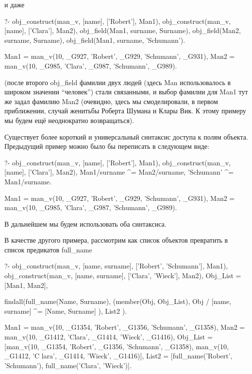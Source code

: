 \documentclass[a4paper]{book}
\begin{document}
и даже

\begin{example}{}{}
?- obj_construct(man_v, [name], ['Robert'], Man1), 
   obj_construct(man_v, [name], ['Clara'], Man2), 
   obj_field(Man1, surname, Surname), 
   obj_field(Man2, surname, Surname), 
   obj_field(Man1, surname, 'Schumann').

Man1 = man_v(10, _G927, 'Robert', _G929, 'Schumann', _G931),
Man2 = man_v(10, _G985, 'Clara', _G987, 'Schumann', _G989).
\end{example}

(после второго obj_field фамилии двух людей (здесь Man
использовалось в широком значении ``человек'') стали связанными,
и выбор фамилии для Man1 тут же задал фамилию Man2 (очевидно,
здесь мы смоделировали, в первом приближении, случай женитьбы
Роберта Шумана и Клары Вик. К этому примеру мы будем ещё
неоднократно возвращаться).

Существует более короткий и универсальный синтаксис доступа к полям
объекта. Предыдущий пример можно было бы переписать в следующем виде:

\begin{example}{}{}
?- obj_construct(man_v, [name], ['Robert'], Man1), 
   obj_construct(man_v, [name], ['Clara'], Man2), 
   Man1/surname ^= Man2/surname,
   'Schumann' ^= Man1/surname.

Man1 = man_v(10, _G927, 'Robert', _G929, 'Schumann', _G931),
Man2 = man_v(10, _G985, 'Clara', _G987, 'Schumann', _G989).
\end{example}

В дальнейшем мы будем использовать оба синтаксиса.

В качестве другого примера, рассмотрим как список объектов превратить в список
предикатов full_name

\begin{bigexample}{}{}
?- obj_construct(man_v, [name, surname], ['Robert', 'Schumann'],
                 Man1), 
   obj_construct(man_v, [name, surname], ['Clara', 'Wieck'],
                 Man2),
   Obj_List = [Man1, Man2], 

   findall(full_name(Name, Surname), 
           (member(Obj, Obj_List), 
            Obj / [name, surname] ^= [Name, Surname]
            ), 
           List2
           ).

Man1 = man_v(10, _G1354, 'Robert', _G1356, 'Schumann', _G1358),
Man2 = man_v(10, _G1412, 'Clara', _G1414, 'Wieck', _G1416),
Obj_List = [man_v(10, _G1354, 'Robert', _G1356, 'Schumann', _G1358), man_v(10, _G1412, 'C
lara', _G1414, 'Wieck', _G1416)],                                                       
List2 = [full_name('Robert', 'Schumann'), full_name('Clara', 'Wieck')].
\end{bigexample}
\end{document}
